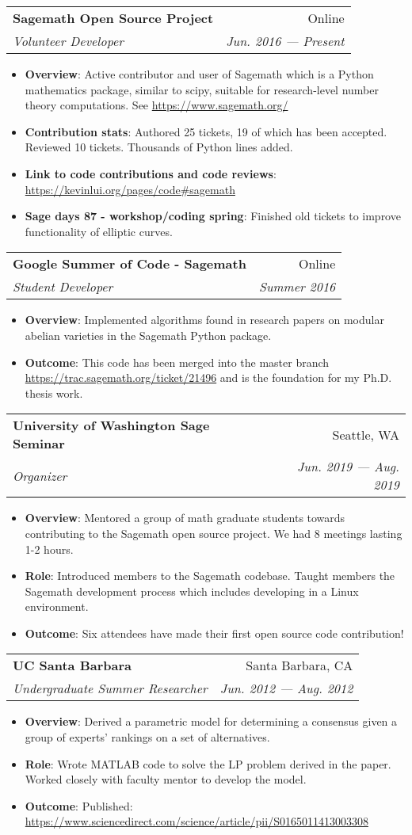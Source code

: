 \documentclass[letterpaper,10pt]{article}
\makeatletter
\newcommand{\resumeItem}[2]{
  \item\small{
    \textbf{#1}{: #2 \vspace{-2pt}}
  }
}
\newcommand{\resumeSubheading}[4]{
  \vspace{-1pt}\item
    \begin{tabular*}{0.97\textwidth}[t]{l@{\extracolsep{\fill}}r}
      \textbf{#1} & #2 \\
      \textit{\small#3} & \textit{\small #4} \\
    \end{tabular*}\vspace{-5pt}
}
\newcommand{\resumeItemListStart}{\begin{itemize}}
\newcommand{\resumeItemListEnd}{\end{itemize}\vspace{-5pt}}
\makeatother
\begin{document}
\resumeSubheading
{Sagemath Open Source Project}{Online}
{Volunteer Developer}{Jun. 2016 --- Present}
\resumeItemListStart
\resumeItem{Overview}
{Active contributor and user of Sagemath which is a Python mathematics
package, similar to scipy, suitable for research-level number theory
computations. See \url{https://www.sagemath.org/}}
\resumeItem{Contribution stats}{Authored 25 tickets, 19 of which has been
accepted. Reviewed 10 tickets. Thousands of Python lines added.}
\resumeItem{Link to
code contributions and code reviews}{\url{https://kevinlui.org/pages/code\#sagemath}}
\resumeItem{Sage days 87 - workshop/coding spring}{Finished old tickets to
improve functionality of elliptic curves.}
\resumeItemListEnd

\resumeSubheading
{Google Summer of Code - Sagemath}{Online}
{Student Developer}{Summer 2016}
\resumeItemListStart
\resumeItem{Overview}
{Implemented algorithms found in research papers on modular abelian varieties
in the Sagemath Python package.} 
\resumeItem{Outcome}{This code has been merged into the master branch
\url{https://trac.sagemath.org/ticket/21496} and is the foundation for my Ph.D.
thesis work.}
\resumeItemListEnd


\resumeSubheading
{University of Washington Sage Seminar}{Seattle, WA}
{Organizer}{Jun. 2019 --- Aug. 2019}
\resumeItemListStart
\resumeItem{Overview}{Mentored a group of math graduate students towards
contributing to the Sagemath open source project. We had 8 meetings lasting
1-2 hours.}
\resumeItem{Role}{Introduced members to the Sagemath codebase. Taught
members the Sagemath development process which includes developing in a Linux
environment.}
\resumeItem{Outcome}{Six attendees have made their first open source code
contribution!}
\resumeItemListEnd

\resumeSubheading
{UC Santa Barbara}{Santa Barbara, CA}
{Undergraduate Summer Researcher}{Jun. 2012 --- Aug. 2012}
\resumeItemListStart
\resumeItem{Overview}{Derived a parametric model for determining a consensus
given a group of experts' rankings on a set of alternatives.}
\resumeItem{Role}{Wrote MATLAB code to solve the LP problem derived in the
paper. Worked closely with faculty mentor to develop the model.}
\resumeItem{Outcome}{Published:
\url{https://www.sciencedirect.com/science/article/pii/S0165011413003308}}
\resumeItemListEnd

\end{document}
